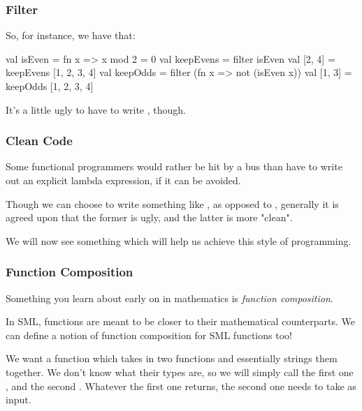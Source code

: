 \documentclass[aspectratio=169, handout]{beamer}
\begin{document}
\begin{frame}[fragile]
  \frametitle{Filter}

  So, for instance, we have that:

  \pause
  \begin{codeblock}
    val isEven = fn x => x mod 2 = 0
    val keepEvens = filter isEven 
    val [2, 4] = keepEvens [1, 2, 3, 4] 
    val keepOdds = filter (fn x => not (isEven x))
    val [1, 3] = keepOdds [1, 2, 3, 4]
  \end{codeblock}

  \pause
  \vspace{\fill}

  It's a little ugly to have to write , though.
\end{frame}

\begin{frame}[fragile]
  \frametitle{Clean Code}

  Some functional programmers would rather be hit by a bus than have to write
  out an explicit lambda expression, if it can be avoided.

  \pause
  \vspace{\fill}

  Though we can choose to write something like
  , as opposed to , generally
  it is agreed upon that the former is ugly, and the latter is more "clean". 

  \pause
  \vspace{\fill}

  We will now see something which will help us achieve this style of programming.
\end{frame}

\begin{frame}[fragile]
  \frametitle{Function Composition}

  Something you learn about early on in mathematics is \textit{function composition}.

  \pause
  \vspace{\fill}

  In SML, functions are meant to be closer to their mathematical counterparts. We
  can define a notion of function composition for SML functions too!

  \pause
  \vspace{\fill}

  We want a function which takes in two functions and essentially strings them
  together. We don't know what their types are, so we will simply call the first
  one , and the second . Whatever the first one 
  returns, the second one needs to take as input.
\end{frame}
\end{document}
